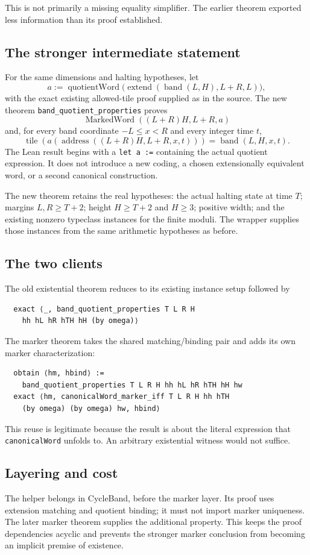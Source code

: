 \documentclass[11pt,letterpaper]{article}
\newcommand{\code}[1]{\nolinkurl{#1}}
\begin{document}
This is not primarily a missing equality simplifier. The earlier theorem exported less information than its proof established.

\subsection{The stronger intermediate statement}
For the same dimensions and halting hypotheses, let
\[
 a:=\operatorname{quotientWord}\bigl(\operatorname{extend}(\operatorname{band}(L,H),L+R,L)\bigr),
\]
with the exact existing allowed-tile proof supplied as in the source. The new theorem \code{band_quotient_properties} proves
\[
 \operatorname{MarkedWord}((L+R)H,L+R,a)
\]
and, for every band coordinate \(-L\leq x<R\) and every integer time \(t\),
\[
 \operatorname{tile}(a(\operatorname{address}((L+R)H,L+R,x,t)))
   =\operatorname{band}(L,H,x,t).
\]
The Lean result begins with a \code{let a :=} containing the actual quotient expression. It does not introduce a new coding, a chosen extensionally equivalent word, or a second canonical construction.

The new theorem retains the real hypotheses: the actual halting state at time \(T\); margins \(L,R\geq T+2\); height \(H\geq T+2\) and \(H\geq3\); positive width; and the existing nonzero typeclass instances for the finite moduli. The wrapper supplies those instances from the same arithmetic hypotheses as before.

\subsection{The two clients}
The old existential theorem reduces to its existing instance setup followed by
\begin{lstlisting}
  exact ⟨_, band_quotient_properties T L R H
    hh hL hR hTH hH (by omega)⟩
\end{lstlisting}

The marker theorem takes the shared matching/binding pair and adds its own marker characterization:
\begin{lstlisting}
  obtain ⟨hm, hbind⟩ :=
    band_quotient_properties T L R H hh hL hR hTH hH hw
  exact ⟨hm, canonicalWord_marker_iff T L R H hh hTH
    (by omega) (by omega) hw, hbind⟩
\end{lstlisting}
This reuse is legitimate because the result is about the literal expression that \code{canonicalWord} unfolds to. An arbitrary existential witness would not suffice.

\subsection{Layering and cost}
The helper belongs in CycleBand, before the marker layer. Its proof uses extension matching and quotient binding; it must not import marker uniqueness. The later marker theorem supplies the additional property. This keeps the proof dependencies acyclic and prevents the stronger marker conclusion from becoming an implicit premise of existence.
\end{document}
